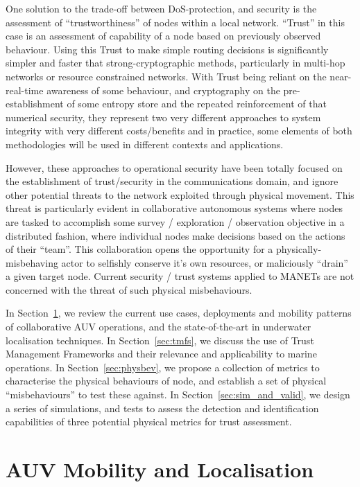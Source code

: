 One solution to the trade-off between DoS-protection, and security is the assessment of ``trustworthiness'' of nodes within a local network. 
``Trust'' in this case is an assessment of capability of a node based on previously observed behaviour.
Using this Trust to make simple routing decisions is significantly simpler and faster that strong-cryptographic methods, particularly in multi-hop networks or resource constrained networks\cite{Cordasco2008}.
With Trust being reliant on the near-real-time awareness of some behaviour, and cryptography on the pre-establishment of some entropy store and the repeated reinforcement of that numerical security, they represent two very different approaches to system integrity with very different costs/benefits and in practice, some elements of both methodologies will be used in different contexts and applications. 

However, these approaches to operational security have been totally focused on the establishment of trust/security in the communications domain, and ignore other potential threats to the network exploited through physical movement.
This threat is particularly evident in collaborative autonomous systems where nodes are tasked to accomplish some survey / exploration / observation objective in a distributed fashion, where individual nodes make decisions based on the actions of their ``team''. 
This collaboration opens the opportunity for a physically-misbehaving actor to selfishly conserve it's own resources, or maliciously ``drain'' a given target node.
Current security / trust systems applied to MANETs are not concerned with the threat of such physical misbehaviours.

In Section~\ref{sec:mobility}, we review the current use cases, deployments and mobility patterns of collaborative AUV operations, and the state-of-the-art in underwater localisation techniques.
In Section~\ref{sec:tmfs}, we discuss the use of Trust Management Frameworks and their relevance and applicability to marine operations. 
In Section~\ref{sec:physbev}, we propose a collection of metrics to characterise the physical behaviours of node, and establish a set of physical ``misbehaviours'' to test these against.
In Section~\ref{sec:sim_and_valid}, we design a series of simulations, and tests to assess the detection and identification capabilities of three potential physical metrics for trust assessment.

\section{AUV Mobility and Localisation}\label{sec:mobility}

